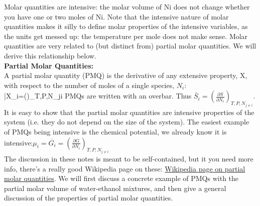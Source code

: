 \documentclass[12pt]{article}
\begin{document}
Molar quantities are intensive: the molar volume of Ni does not change whether you have one or two moles of Ni. Note that the intensive nature of molar quantities makes it silly to define molar properties of the intensive variables, as the units get messed up: the temperature per mole does not make sense. Molar quantities are very related to (but distinct from) partial molar quantities. We will derive this relationship below.\\

\textbf{Partial Molar Quantities:}\\
A partial molar quantity (PMQ) is the derivative of any extensive property, X, with respect to the number of moles of a single species, $N_i$:\\
\eqs \bar{X}_i=\left(\right)_{T,P,N_{j\neq i}}\eqe
PMQs are written with an overbar. Thus $\bar{S}_i=\left(\frac{\partial S}{\partial N_i}\right)_{T,P,N_{j\neq i}}$. It is easy to show that the partial molar quantities are intensive properties of the system (i.e. they do not depend on the size of the system). The easiest example of PMQs being intensive is the chemical potential, we already know it is intensive:$\mu _i=\overline{G_i}=\left(\frac{\partial G}{\partial N_i}\right)_{T,P,N_{j\neq i}}$\\
The discussion in these notes is meant to be self-contained, but it you need more info, there{'}s a really good Wikipedia page on these: \href{https://en.wikipedia.org/wiki/Partial_molar_property}{Wikipedia page on partial molar quantities}. We will first discuss a concrete example of PMQs with the partial molar volume of water-ethanol mixtures, and then give a general discussion of the properties of partial molar quantities.\\
\end{document}
